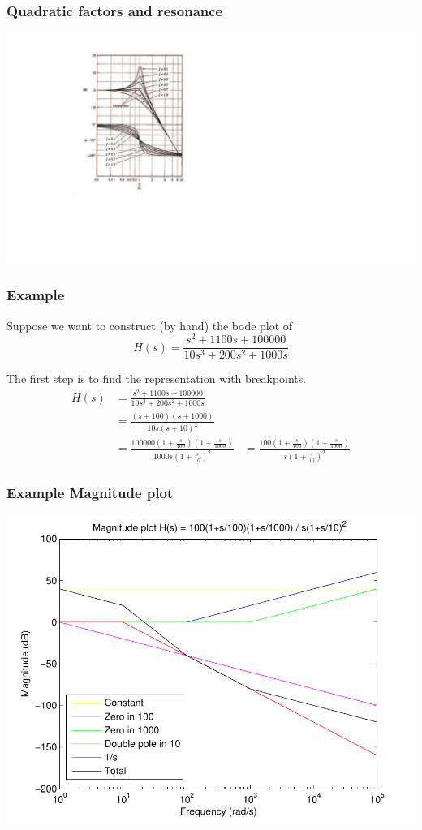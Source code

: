 \begin{frame}
\frametitle{Quadratic factors and resonance}


\includegraphics[scale = 0.5]{Resonance}


\end{frame}


\begin{frame}
\frametitle{Example}
Suppose we want to construct (by hand) the bode plot of $$H(s) = \frac{s^2 + 1100s + 100000}{10s^3 + 200s^2 + 1000s}$$

The first step is to find the representation with breakpoints.
\begin{align*}
    H(s) &=  \frac{s^2 + 1100s + 100000}{10s^3 + 200s^2 + 1000s}\\
            &= \frac{(s+100)(s+1000)}{10s(s+10)^2}\\
	 &= \frac{100000(1+\frac{s}{100})(1+\frac{s}{1000})}{1000s(1+\frac{s}{10})^2}
	 &= \frac{100(1+\frac{s}{100})(1+\frac{s}{1000})}{s(1+\frac{s}{10})^2}
\end{align*}

\end{frame}

\begin{frame}
\frametitle{Example Magnitude plot}

\begin{center}
\includegraphics[scale=0.5]{MagnitudeParts}
\end{center}


\end{frame}

